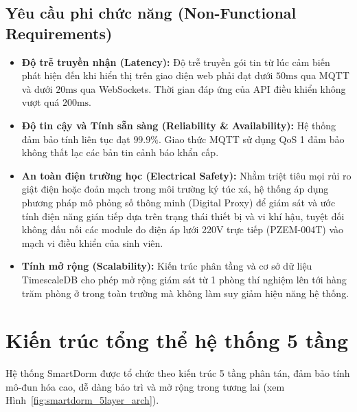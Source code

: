 \subsection{Yêu cầu phi chức năng (Non-Functional Requirements)}
\begin{itemize}
    \item \textbf{Độ trễ truyền nhận (Latency):} Độ trễ truyền gói tin từ lúc cảm biến phát hiện đến khi hiển thị trên giao diện web phải đạt dưới $50\text{ms}$ qua MQTT và dưới $20\text{ms}$ qua WebSockets. Thời gian đáp ứng của API điều khiển không vượt quá $200\text{ms}$.
    \item \textbf{Độ tin cậy và Tính sẵn sàng (Reliability \& Availability):} Hệ thống đảm bảo tính liên tục đạt $99.9\%$. Giao thức MQTT sử dụng QoS 1 đảm bảo không thất lạc các bản tin cảnh báo khẩn cấp.
    \item \textbf{An toàn điện trường học (Electrical Safety):} Nhằm triệt tiêu mọi rủi ro giật điện hoặc đoản mạch trong môi trường ký túc xá, hệ thống áp dụng phương pháp mô phỏng số thông minh (Digital Proxy) để giám sát và ước tính điện năng gián tiếp dựa trên trạng thái thiết bị và vi khí hậu, tuyệt đối không đấu nối các module đo điện áp lưới 220V trực tiếp (PZEM-004T) vào mạch vi điều khiển của sinh viên.
    \item \textbf{Tính mở rộng (Scalability):} Kiến trúc phân tầng và cơ sở dữ liệu TimescaleDB cho phép mở rộng giám sát từ 1 phòng thí nghiệm lên tới hàng trăm phòng ở trong toàn trường mà không làm suy giảm hiệu năng hệ thống.
\end{itemize}

\section{Kiến trúc tổng thể hệ thống 5 tầng}
\label{sec:kien_truc_tong_the}

Hệ thống SmartDorm được tổ chức theo kiến trúc 5 tầng phân tán, đảm bảo tính mô-đun hóa cao, dễ dàng bảo trì và mở rộng trong tương lai (xem Hình~\ref{fig:smartdorm_5layer_arch}).

